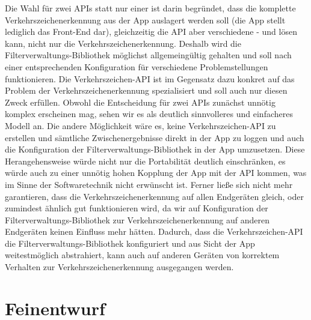 \documentclass[12pt,a4paper,ngerman,enabledeprecatedfontcommands]{scrreprt}
\begin{document}
Die Wahl für zwei \gls{API}s statt nur einer ist darin begründet, dass die komplette Verkehrszeichenerkennung aus der \gls{App} auslagert werden soll (die \gls{App} stellt lediglich das Front-End dar), gleichzeitig die \gls{API} aber verschiedene - und  lösen kann, nicht nur die Verkehrszeichenerkennung. Deshalb wird die  \gls{Filterverwaltungs-Bibliothek}  möglichst allgemeingültig gehalten und soll nach einer entsprechenden Konfiguration für verschiedene Problemstellungen funktionieren. Die \gls{Verkehrszeichen-API} ist im Gegensatz dazu konkret auf das Problem der Verkehrszeichenerkennung spezialisiert und soll auch nur diesen Zweck erfüllen. Obwohl die Entscheidung für zwei \gls{API}s zunächst unnötig komplex erscheinen mag, sehen wir es als deutlich sinnvolleres und einfacheres Modell an.
Die andere Möglichkeit wäre es, keine \gls{Verkehrszeichen-API} zu erstellen und sämtliche Zwischenergebnisse direkt in der \gls{App} zu loggen und auch die Konfiguration der \gls{Filterverwaltungs-Bibliothek} in der \gls{App} umzusetzen. Diese Herangehensweise würde nicht nur die Portabilität deutlich einschränken, es würde auch zu einer unnötig hohen Kopplung der \gls{App} mit der \gls{API} kommen, was im Sinne der Softwaretechnik nicht erwünscht ist. Ferner ließe sich nicht mehr garantieren, dass die Verkehrszeichenerkennung auf allen Endgeräten gleich, oder zumindest ähnlich gut funktionieren wird, da wir auf Konfiguration der  \gls{Filterverwaltungs-Bibliothek}  zur Verkehrszeichenerkennung auf anderen Endgeräten keinen Einfluss mehr hätten.
Dadurch, dass die \gls{Verkehrszeichen-API} die  \gls{Filterverwaltungs-Bibliothek}  konfiguriert und aus Sicht der \gls{App} weitestmöglich abstrahiert, kann auch auf anderen Geräten von korrektem Verhalten zur Verkehrszeichenerkennung ausgegangen werden.\\

\part{Feinentwurf}\label{part:feinentwurf}
\end{document}
